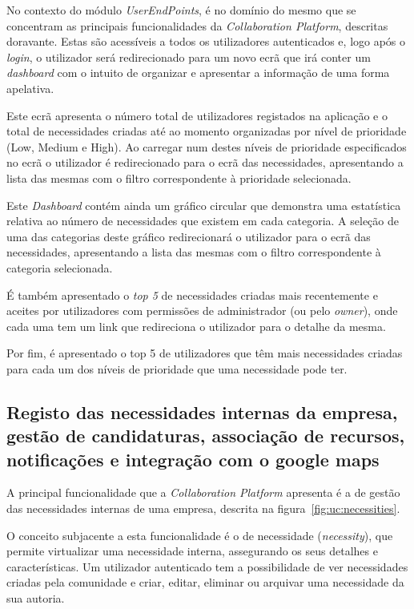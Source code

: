 No contexto do módulo \textit{UserEndPoints}, é no domínio do mesmo que se concentram as principais funcionalidades da \textit{Collaboration Platform}, descritas doravante. 
Estas são acessíveis a todos os utilizadores autenticados e, logo após o \textit{login}, o utilizador será redirecionado para um novo ecrã que irá conter um \textit{dashboard} com o intuito de organizar e 
apresentar a informação de uma forma apelativa. 
\par
Este ecrã apresenta o número total de utilizadores registados na aplicação e o total de necessidades criadas até ao momento organizadas por nível de prioridade (Low, Medium e High). 
Ao carregar num destes níveis de prioridade especificados no ecrã o utilizador é redirecionado para o ecrã das necessidades, apresentando a lista das mesmas com o filtro correspondente à prioridade selecionada. 
\par
Este \textit{Dashboard} contém ainda um gráfico circular que demonstra uma estatística relativa ao número de necessidades que existem em cada categoria. A seleção de uma das categorias deste gráfico redirecionará o utilizador para o ecrã das necessidades, apresentando a lista das mesmas com o filtro correspondente à categoria selecionada.
\par
É também apresentado o \textit{top 5} de necessidades criadas mais recentemente e aceites por utilizadores com permissões de administrador (ou pelo \textit{owner}), onde cada uma tem um link que redireciona o utilizador para o detalhe da mesma. 
\par
Por fim, é apresentado o top 5 de utilizadores que têm mais necessidades criadas para cada um dos níveis de prioridade que uma necessidade pode ter.

\newpage

\subsection{Registo das necessidades internas da empresa, gestão de candidaturas, associação de recursos, notificações e integração com o google maps}\label{subsec:necessitiesCandidatesNotificationsGoogleMaps}

A principal funcionalidade que a \textit{Collaboration Platform} apresenta é a de gestão das necessidades internas de uma empresa, descrita na figura~\ref{fig:uc:necessities}.

\par
O conceito subjacente a esta funcionalidade é o de necessidade (\textit{necessity}), que permite virtualizar uma necessidade interna, assegurando os seus detalhes e características.
Um utilizador autenticado tem a possibilidade de ver necessidades criadas pela comunidade e criar, editar, eliminar ou arquivar uma necessidade da sua autoria.

